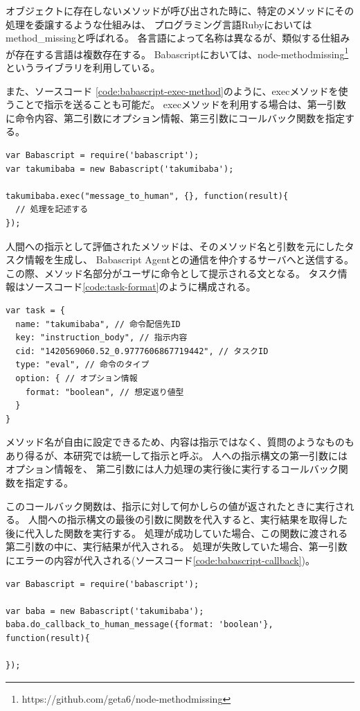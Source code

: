 オブジェクトに存在しないメソッドが呼び出された時に、特定のメソッドにその処理を委譲するような仕組みは、
プログラミング言語Rubyにおいてはmethod\_missingと呼ばれる。
各言語によって名称は異なるが、類似する仕組みが存在する言語は複数存在する。
Babascriptにおいては、node-methodmissing\footnote{https://github.com/geta6/node-methodmissing}というライブラリを利用している。

また、ソースコード
\ref{code:babascript-exec-method}のように、execメソッドを使うことで指示を送ることも可能だ。
execメソッドを利用する場合は、第一引数に命令内容、第二引数にオプション情報、第三引数にコールバック関数を指定する。

\begin{lstlisting}[caption=execメソッドによる指示構文, label=code:babascript-exec-method]
var Babascript = require('babascript');
var takumibaba = new Babascript('takumibaba');

takumibaba.exec("message_to_human", {}, function(result){
  // 処理を記述する
});
\end{lstlisting}

人間への指示として評価されたメソッドは、そのメソッド名と引数を元にしたタスク情報を生成し、
Babascript Agentとの通信を仲介するサーバへと送信する。
この際、メソッド名部分がユーザに命令として提示される文となる。
タスク情報はソースコード\ref{code:task-format}のように構成される。

\begin{lstlisting}[caption=タスク情報の例, label=code:task-format]
var task = {
  name: "takumibaba", // 命令配信先ID
  key: "instruction_body", // 指示内容
  cid: "1420569060.52_0.9777606867719442", // タスクID
  type: "eval", // 命令のタイプ
  option: { // オプション情報
    format: "boolean", // 想定返り値型
  }
}
\end{lstlisting}

メソッド名が自由に設定できるため、内容は指示ではなく、質問のようなものもあり得るが、本研究では統一して指示と呼ぶ。
人への指示構文の第一引数にはオプション情報を、
第二引数には人力処理の実行後に実行するコールバック関数を指定する。

このコールバック関数は、指示に対して何かしらの値が返されたときに実行される。
人間への指示構文の最後の引数に関数を代入すると、実行結果を取得した後に代入した関数を実行する。
処理が成功していた場合、この関数に渡される第二引数の中に、実行結果が代入される。
処理が失敗していた場合、第一引数にエラーの内容が代入される(ソースコード\ref{code:babascript-callback})。

\begin{lstlisting}[caption=コールバック関数の指定, label=code:babascript-callback]
var Babascript = require('babascript');

var baba = new Babascript('takumibaba');
baba.do_callback_to_human_message({format: 'boolean'}, function(result){

});
\end{lstlisting}

